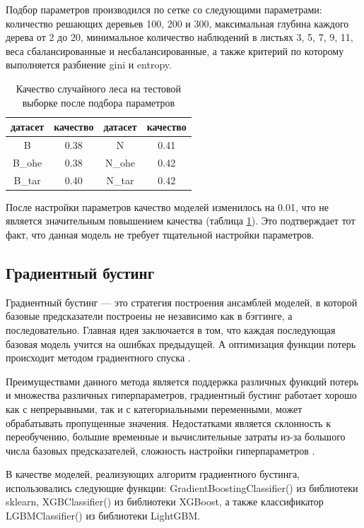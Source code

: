 \documentclass[14pt]{mmcs_article}
\begin{document}
Подбор параметров производился по сетке со следующими параметрами: количество решающих деревьев 100, 200 и 300, максимальная глубина каждого дерева от 2 до 20, минимальное количество наблюдений в листьях 3, 5, 7, 9, 11, веса сбалансированные и несбалансированные, а также критерий по которому выполняется разбиение gini и entropy.

\begin{table}[H]
	\centering
	\caption{Качество случайного леса на тестовой выборке после подбора параметров}\label{models:table6}
	\begin{tabular}{cccc}
		\hline
		датасет & качество	& датасет & качество \\
		\hline
		B &	0.38 &	N &	0.41 \\
		B\_ohe & 0.38 &	N\_ohe & 0.42\\
		B\_tar & 0.40 & N\_tar & 0.42 \\
		\hline
	\end{tabular}
\end{table}

После настройки параметров качество моделей изменилось на 0.01, что не является значительным повышением качества (таблица \ref{models:table6}). Это подтверждает тот факт, что данная модель не требует тщательной настройки параметров.

\subsection{Градиентный бустинг}

Градиентный бустинг --- это стратегия построения ансамблей моделей, в которой базовые предсказатели построены не независимо как в бэггинге, а последовательно. Главная идея заключается в том, что каждая последующая базовая модель учится на ошибках предыдущей. А оптимизация функции потерь происходит методом градиентного спуска \cite{lib:gradboost}.

Преимуществами данного метода является поддержка различных функций потерь и множества различных гиперпараметров, градиентный бустинг работает хорошо как с непрерывными, так и с категориальными переменными, может обрабатывать пропущенные значения. Недостатками является склонность к переобучению, большие временные и вычислительные затраты из-за большого числа базовых предсказателей, сложность настройки гиперпараметров \cite{lib:gradboost2}.

В качестве моделей, реализующих алгоритм градиентного бустинга, использовались следующие функции: GradientBoostingClassifier() из библиотеки sklearn, XGBClassifier() из библиотеки XGBoost, а также классификатор LGBMClassifier() из библиотеки LightGBM.
\end{document}
